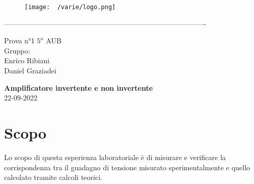 \documentclass[12pt]{article}
\begin{document}
    \begin{titlepage}
    \begin{center}
\begin{figure}
    \centering
    \texttt{[image: ~/varie/logo.png]}
    \label{fig:logo}
\end{figure}
-------------------------------------------------------------------------------------\\
\vspace{4\baselineskip}


\large Prova n°1
\hfill
\large $5^a$   AUB\\

\Large Gruppo:\\
\large Enrico Ribiani\\
\large Daniel Graziadei\\


\vfill

\Huge{\textbf{Amplificatore invertente e non invertente}}\\
\vfill
\vfill
\large{22-09-2022}
\end{center}

\end{titlepage}
\tableofcontents
\newpage
\section{Scopo}
Lo scopo di questa esperienza laboratoriale è di misurare e verificare la corrispondenza tra
il guadagno di tensione misurato sperimentalmente e quello calcolato tramite calcoli teorici.\\
\end{document}
